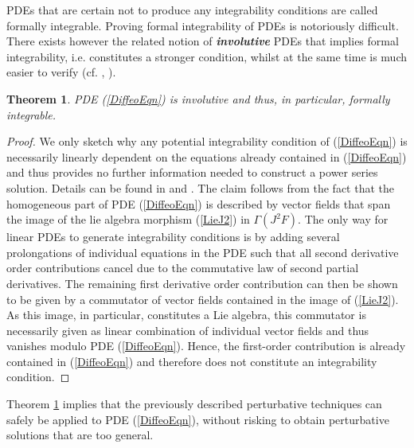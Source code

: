 \documentclass[%
preprint,
titlepage,
nofootinbib,
amsmath,amssymb,
showkeys,
aps,
prd,
floatfix,
]{revtex4-2}
\newtheorem{theorem}{Theorem}
\begin{document}
PDEs that are certain not to produce any integrability conditions are called formally integrable.
Proving formal integrability of PDEs is notoriously difficult. There exists however the related notion of \textit{\textbf{involutive}} PDEs that implies formal integrability, i.e. constitutes a stronger condition, whilst at the same time is much easier to verify (cf. \cite{seiler2009involution}, \cite{seiler1994analysis}).  
\begin{theorem}\label{Invol}
PDE (\ref{DiffeoEqn}) is involutive and thus, in particular, formally integrable.
\end{theorem}
\begin{proof}
We only sketch why any potential integrability condition of (\ref{DiffeoEqn}) is necessarily linearly dependent on the equations already contained in  (\ref{DiffeoEqn}) and thus provides no further information needed to construct a power series solution.
Details can be found in \cite{seiler1994analysis} and \cite{TobiMaster}.
The claim follows from the fact that the homogeneous part of PDE (\ref{DiffeoEqn}) is described by vector fields that span the image of the lie algebra morphism (\ref{LieJ2}) in $\Gamma(J^2F)$. The only way for linear PDEs to generate integrability conditions is by adding several prolongations of individual equations in the PDE such that all second derivative order contributions cancel due to the commutative law of second partial derivatives. The remaining first derivative order contribution can then be shown to be given by a commutator of vector fields contained in the image of (\ref{LieJ2}). As this image, in particular, constitutes a Lie algebra, this commutator is necessarily given as linear combination of individual vector fields and thus vanishes modulo PDE (\ref{DiffeoEqn}). Hence, the first-order contribution is already contained in (\ref{DiffeoEqn}) and therefore does not constitute an integrability condition. 
\end{proof}
Theorem \ref{Invol} implies that the previously described perturbative techniques can safely be applied to PDE (\ref{DiffeoEqn}), without risking to obtain perturbative solutions that are too general. 
\end{document}
